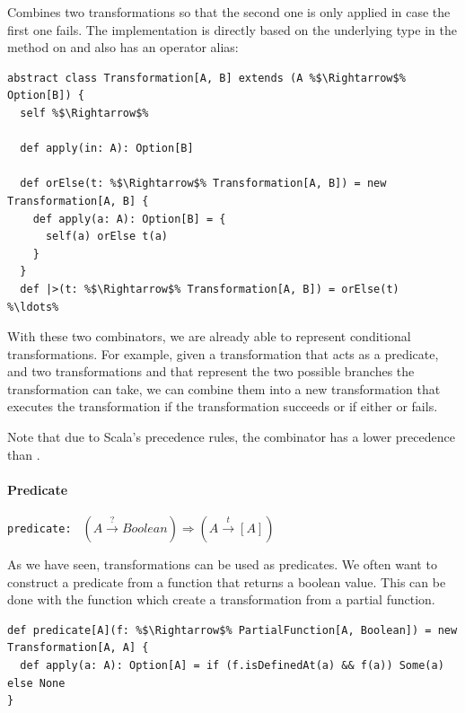 \vspace{7pt} Combines two transformations so that the second one is only applied in case the first one fails. The implementation is directly based on the underlying  type in the  method on  and also has an operator alias:

\begin{lstlisting}
abstract class Transformation[A, B] extends (A %$\Rightarrow$% Option[B]) {
  self %$\Rightarrow$%

  def apply(in: A): Option[B]

  def orElse(t: %$\Rightarrow$% Transformation[A, B]) = new Transformation[A, B] {
    def apply(a: A): Option[B] = {
      self(a) orElse t(a)
    }
  }
  def |>(t: %$\Rightarrow$% Transformation[A, B]) = orElse(t)
%\ldots%
\end{lstlisting}

With these two combinators, we are already able to represent conditional transformations. For example, given a transformation  that acts as a predicate, and two transformations  and  that represent the two possible branches the transformation can take, we can combine them into a new transformation  that executes the  transformation if the  transformation succeeds or  if either  or  fails.

Note that due to Scala's precedence rules, the \src{|>} combinator has a lower precedence than \src{\&>}.

\paragraph{Predicate} \hfill \lstinline{predicate: } $(A \overset{?}{\rightarrow} Boolean) \Rightarrow (A \overset{t}{\rightarrow} [A])$

\vspace{7pt} As we have seen, transformations can be used as predicates. We often want to construct a predicate from a function that returns a boolean value. This can be done with the  function which create a transformation from a partial function.

\begin{lstlisting}
def predicate[A](f: %$\Rightarrow$% PartialFunction[A, Boolean]) = new Transformation[A, A] {
  def apply(a: A): Option[A] = if (f.isDefinedAt(a) && f(a)) Some(a) else None
}
\end{lstlisting}

